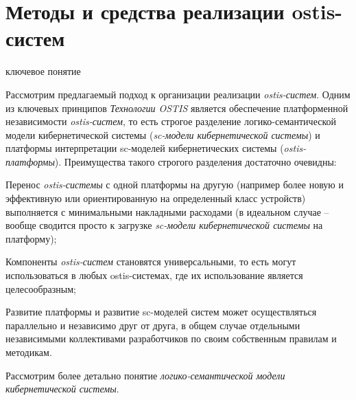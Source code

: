 \section{Методы и средства реализации ostis-систем}
\label{sec_interpreter_ostis_impl}

\begin{SCn}
\begin{scnrelfromlist}{ключевое понятие}
\end{scnrelfromlist}
\end{SCn}

Рассмотрим предлагаемый подход к организации реализации \textit{ostis-систем}. Одним из ключевых принципов \textit{Технологии OSTIS} является обеспечение платформенной независимости \textit{ostis-систем}, то есть строгое разделение логико-семантической модели кибернетической системы (\textit{sc-модели кибернетической системы}) и платформы интерпретации sc-моделей кибернетических системы (\textit{ostis-платформы}). Преимущества такого строгого разделения достаточно очевидны:
\begin{textitemize}
	\item Перенос \textit{ostis-системы} с одной платформы на другую (например более новую и эффективную или ориентированную на определенный класс устройств) выполняется с минимальными накладными расходами (в идеальном случае -- вообще сводится просто к загрузке \textit{sc-модели кибернетической системы} на платформу);
	\item Компоненты \textit{ostis-систем} становятся универсальными, то есть могут использоваться в любых ostis-системах, где их использование является целесообразным;
	\item Развитие платформы и развитие sc-моделей систем может осуществляться параллельно и независимо друг от друга, в общем случае отдельными независимыми коллективами разработчиков по своим собственным правилам и методикам.
\end{textitemize}

Рассмотрим более детально понятие \textit{логико-семантической модели кибернетической системы}.

